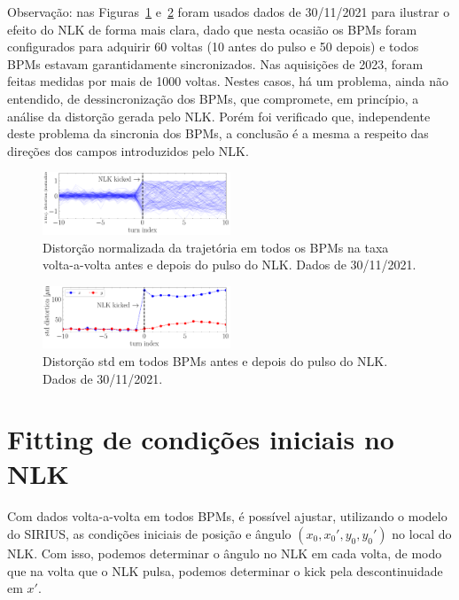 \documentclass[a4paper,
               keeplastbox,   %
               ]{jacow}
\begin{document}
Observação: nas Figuras~\ref{fig:effect_bpms} e~\ref{fig:effect_std} foram usados dados de 30/11/2021 para ilustrar o efeito do NLK de forma mais clara, dado que nesta ocasião os BPMs foram configurados para adquirir 60 voltas (10 antes do pulso e 50 depois) e todos BPMs estavam garantidamente sincronizados. Nas aquisições de 2023, foram feitas medidas por mais de 1000 voltas. Nestes casos, há um problema, ainda não entendido, de dessincronização dos BPMs, que compromete, em princípio, a análise da distorção gerada pelo NLK. Porém foi verificado que, independente deste problema da sincronia dos BPMs, a conclusão é a mesma a respeito das direções dos campos introduzidos pelo NLK.
\begin{figure}[!h]
    \centering
    \includegraphics*[width=0.5\textwidth]{nlk_kick_effect.png}
    \caption{Distorção normalizada da trajetória em todos os BPMs na taxa volta-a-volta antes e depois do pulso do NLK. Dados de 30/11/2021.}
    \label{fig:effect_bpms}
\end{figure}
\begin{figure}[!h]
    \centering
    \includegraphics*[width=0.5\textwidth]{nlk_kick_effect_std.png}
    \caption{Distorção std em todos BPMs antes e depois do pulso do NLK. Dados de 30/11/2021.}
    \label{fig:effect_std}
\end{figure}
\section{Fitting de condições iniciais no NLK}
Com dados volta-a-volta em todos BPMs, é possível ajustar, utilizando o modelo do SIRIUS, as condições iniciais de posição e ângulo $(x_0, x_0', y_0, y_0')$ no local do NLK. Com isso, podemos determinar o ângulo no NLK em cada volta, de modo que na volta que o NLK pulsa, podemos determinar o kick pela descontinuidade em $x'$. 
\end{document}
